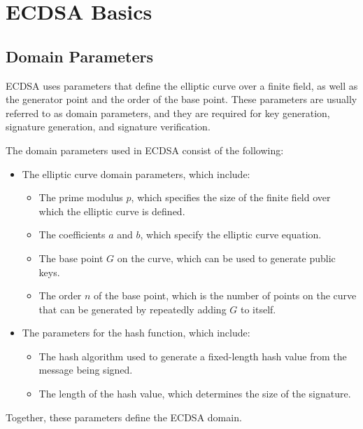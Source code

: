 \documentclass[main\_\_EN.tex]{subfiles}
\begin{document}

\label{sec:ecdsa-terminology}

\section{ECDSA Basics}
\subsection{Domain Parameters}

ECDSA uses parameters that define the elliptic curve over a finite field, as well as the generator point and the order of the base point. These parameters are usually referred to as domain parameters, and they are required for key generation, signature generation, and signature verification.

The domain parameters used in ECDSA consist of the following:

\begin{itemize}
    \item The elliptic curve domain parameters, which include:
            \begin{itemize}
                \item The prime modulus $p$, which specifies the size of the finite field over which the elliptic curve is defined.
                \item The coefficients $a$ and $b$, which specify the elliptic curve equation.
                \item The base point $G$ on the curve, which can be used to generate public keys.
                \item The order $n$ of the base point, which is the number of points on the curve that can be generated by repeatedly adding $G$ to itself.
            \end{itemize}
    \item The parameters for the hash function, which include:
          \begin{itemize}
              \item The hash algorithm used to generate a fixed-length hash value from the message being signed.
              \item The length of the hash value, which determines the size of the signature.
          \end{itemize}
\end{itemize}

Together, these parameters define the ECDSA domain.
\end{document}
